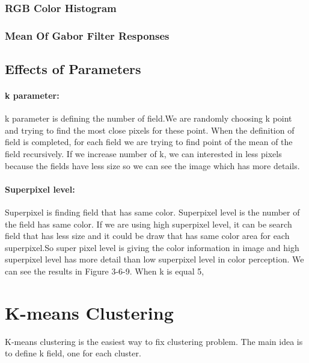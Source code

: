 \documentclass[12pt]{article}
\begin{document}
\subsubsection*{RGB Color Histogram}

\subsubsection*{Mean Of Gabor Filter Responses}

\subsection{Effects of Parameters}
\paragraph{k parameter:} k parameter is defining the number of field.We are randomly choosing k point and trying to find the most close pixels for these point. When the definition of field is completed, for each field we are trying to find point of the mean of the field recursively. If we increase number of k, we can interested in less pixels because the fields have less size so we can see the image which has more details.

\paragraph{Superpixel level:} Superpixel is finding field that has same color. Superpixel level is the number of the field has same color. If we are using high superpixel level, it can be search field that has less size and it could be draw that has same color area for each superpixel.So super pixel level is giving the color information in image and high superpixel level has more detail than low superpixel level in color perception. We can see the results in Figure 3-6-9. When k is equal 5, 

\section{K-means Clustering}
K-means clustering is the easiest way to fix clustering problem. The main idea is to define k field, one for each cluster. 
\end{document}
